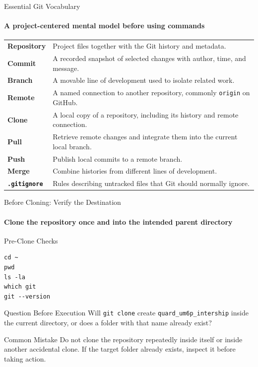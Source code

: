 \begin{frame}{Essential Git Vocabulary}
\framesubtitle{A project-centered mental model before using commands}
\scriptsize
\renewcommand{\arraystretch}{1.16}
\begin{tabularx}{\textwidth}{>{\bfseries\color{um6p-color-dark-blue}}p{} X}
\toprule
Repository & Project files together with the Git history and metadata. \\
Commit & A recorded snapshot of selected changes with author, time, and message. \\
Branch & A movable line of development used to isolate related work. \\
Remote & A named connection to another repository, commonly \texttt{origin} on GitHub. \\
Clone & A local copy of a repository, including its history and remote connection. \\
Pull & Retrieve remote changes and integrate them into the current local branch. \\
Push & Publish local commits to a remote branch. \\
Merge & Combine histories from different lines of development. \\
\texttt{.gitignore} & Rules describing untracked files that Git should normally ignore. \\
\bottomrule
\end{tabularx}
\end{frame}



\begin{frame}[fragile]{Before Cloning: Verify the Destination}
\framesubtitle{Clone the repository once and into the intended parent directory}
\footnotesize
\begin{block}{Pre-Clone Checks}
\begin{verbatim}
cd ~
pwd
ls -la
which git
git --version
\end{verbatim}
\end{block}
\begin{exampleblock}{Question Before Execution}
Will \texttt{git clone} create \texttt{quard\_um6p\_intership} inside the current directory, or does a folder with that name already exist?
\end{exampleblock}
\begin{alertblock}{Common Mistake}
Do not clone the repository repeatedly inside itself or inside another accidental clone. If the target folder already exists, inspect it before taking action.
\end{alertblock}
\end{frame}

